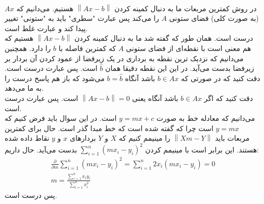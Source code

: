 \\
در روش کمترین مربعات ما به دنبال کمینه کردن
$\left\|Ax - b\right\|$
هستیم. می‌دانیم که
$Ax$
(به صورت کلی)
فضای ستونی
$A$
را
می‌کند پس عبارت
"سطری"
باید به 
"ستونی"
تغییر پیدا کند و عبارت غلط است.
\\
درست است. همان طور که گفته شد ما به دنبال کمینه کردن
$\left\|Ax - b\right\|$
هستیم که هم معنی است با نقطه‌ای از فضای ستونی
$A$
که کمترین فاصله با
$b$
را دارد. همچنین می‌دانیم که نزدیک ترین نقطه به برداری در یک زیرفضا از عمود کردن آن بردار بر زیرفضا بدست می‌آید.
در این این نقطه دقیقا همان
$\hat{b}$
است. پس عبارت درست است.
دقت کنید که در صورتی که
$b \in Ax$
باشد آنگاه
$b = \hat{b}$
می‌شود که باز هم پاسخ درست را به ما می‌دهد.
\\
دقت کنید که اگر
$b \in Ax$
باشد آنگاه یعنی
$\left\|Ax - b\right\| = 0$
است. پس عبارت درست است.
\\
می‌دانیم که معادله خط به صورت
$y = mx + c$
است. در این سوال باید فرض کنیم که
$y = mx$
است چرا که گفته شده است که خط مبدا گذر است. حال برای کمترین مربعات باید
$\left\|Xm - Y\right\|$
را مینیمم کنیم که
$X$ و $Y$
بردار‌های
$x$ و $y$
نقاط داده شده هستند. این برابر است با مینیمم کردن
$\sum_{i=1}^n (mx_i - y_i)^2$
بدست می‌آید. حال داریم:
\begin{gather*}
    \frac{\partial}{\partial m} \sum_{i=1}^n (mx_i - y_i)^2 = \sum_{i=1}^n 2 x_i (mx_i - y_i) = 0\\
    m = \frac{\sum_{i=1}^n x_i y_i}{\sum_{i=1}^n x_i^2}
\end{gather*}
پس درست است.



